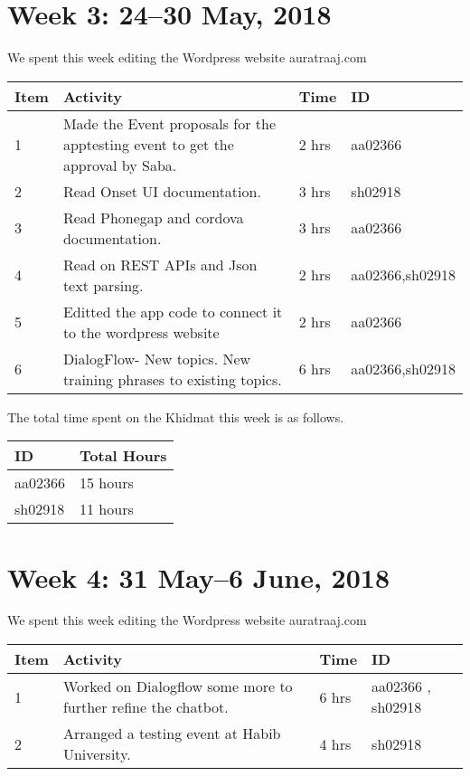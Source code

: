 ﻿\documentclass{article}
\begin{document}
\newpage %
\section*{Week 3: 24--30 May, 2018}

We spent this week editing the Wordpress website auratraaj.com

\begin{tabular}{|l|l|l|l|}
  \hline
  Item 	& Activity & Time & ID \\\hline\hline
  1	& Made the Event proposals for the apptesting event to get the approval by Saba. & 2 hrs & aa02366 \\\hline
  2	& Read Onset UI documentation. & 3 hrs & sh02918 
  \\\hline
  3	& Read Phonegap and cordova documentation. & 3 hrs & aa02366 \\\hline
  4	& Read on REST APIs and Json text parsing. & 2 hrs & aa02366,sh02918 \\\hline  
  5	& Editted the app code to connect it to the wordpress website & 2 hrs & aa02366 
  \\\hline
  6	& DialogFlow- New topics. New training phrases to existing topics. & 6 hrs & aa02366,sh02918 \\\hline

\end{tabular}

The total time spent on the Khidmat this week is as follows.

\begin{tabular}{|l|l|}
  \hline
  ID & Total Hours\\\hline\hline
  aa02366 & 15 hours\\\hline
  sh02918 & 11 hours\\\hline
\end{tabular}



\newpage %
\section*{Week 4: 31 May--6 June, 2018}

We spent this week editing the Wordpress website auratraaj.com

\begin{tabular}{|l|l|l|l|}
  \hline
  Item 	& Activity & Time & ID \\\hline\hline
  1	& Worked on Dialogflow some more to further refine the chatbot. & 6 hrs & aa02366 , sh02918 \\\hline
  2	& Arranged a testing event at Habib University. & 4 hrs & sh02918 \\\hline
  

\end{tabular}
\end{document}
